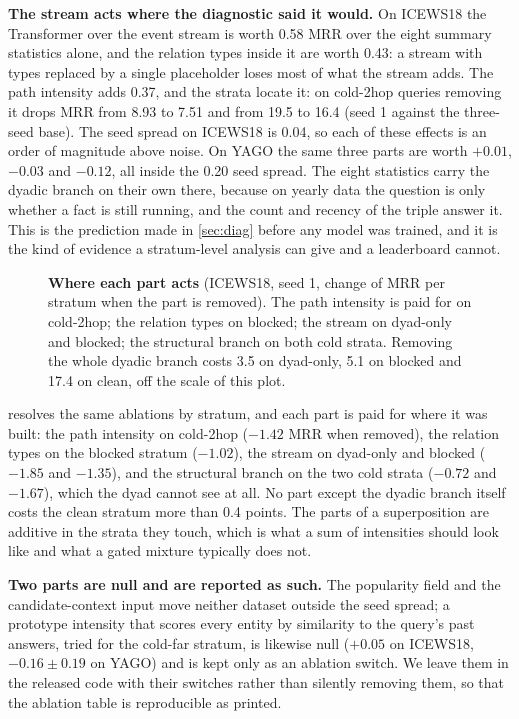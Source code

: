 \textbf{The stream acts where the diagnostic said it would.} On ICEWS18 the Transformer over the event stream is worth 0.58 MRR over the eight summary statistics alone, and the relation types inside it are worth 0.43: a stream with types replaced by a single placeholder loses most of what the stream adds. The path intensity adds 0.37, and the strata locate it: on cold-2hop queries removing it drops MRR from 8.93 to 7.51 and \hten{} from 19.5 to 16.4 (seed 1 against the three-seed base). The seed spread on ICEWS18 is 0.04, so each of these effects is an order of magnitude above noise. On YAGO the same three parts are worth $+0.01$, $-0.03$ and $-0.12$, all inside the 0.20 seed spread. The eight statistics carry the dyadic branch on their own there, because on yearly data the question is only whether a fact is still running, and the count and recency of the triple answer it. This is the prediction made in \cref{sec:diag} before any model was trained, and it is the kind of evidence a stratum-level analysis can give and a leaderboard cannot.

\begin{figure}[t]
  \centering
  \caption{\textbf{Where each part acts} (ICEWS18, seed 1, change of MRR per stratum when the part is removed). The path intensity is paid for on cold-2hop; the relation types on blocked; the stream on dyad-only and blocked; the structural branch on both cold strata. Removing the whole dyadic branch costs 3.5 on dyad-only, 5.1 on blocked and 17.4 on clean, off the scale of this plot.}
  \label{fig:ablation-strata}
\end{figure}

 resolves the same ablations by stratum, and each part is paid for where it was built: the path intensity on cold-2hop ($-1.42$ MRR when removed), the relation types on the blocked stratum ($-1.02$), the stream on dyad-only and blocked ($-1.85$ and $-1.35$), and the structural branch on the two cold strata ($-0.72$ and $-1.67$), which the dyad cannot see at all. No part except the dyadic branch itself costs the clean stratum more than 0.4 points. The parts of a superposition are additive in the strata they touch, which is what a sum of intensities should look like and what a gated mixture typically does not.

\textbf{Two parts are null and are reported as such.} The popularity field and the candidate-context input move neither dataset outside the seed spread; a prototype intensity that scores every entity by similarity to the query's past answers, tried for the cold-far stratum, is likewise null ($+0.05$ on ICEWS18, $-0.16 \pm 0.19$ on YAGO) and is kept only as an ablation switch. We leave them in the released code with their switches rather than silently removing them, so that the ablation table is reproducible as printed.


